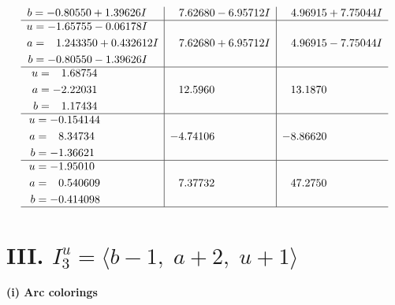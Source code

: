 \documentclass[1p]{elsarticle_modified}
\theoremstyle{definition}
\begin{document}
$$\begin{array}{c|c|c}
\begin{aligned}
b &= -0.80550 + 1.39626 I\end{aligned}
 & \phantom{-}7.62680 - 6.95712 I & \phantom{-}4.96915 + 7.75044 I \\ \hline\begin{aligned}
u &= -1.65755 - 0.06178 I \\
a &= \phantom{-}1.243350 + 0.432612 I \\
b &= -0.80550 - 1.39626 I\end{aligned}
 & \phantom{-}7.62680 + 6.95712 I & \phantom{-}4.96915 - 7.75044 I \\ \hline\begin{aligned}
u &= \phantom{-}1.68754\phantom{ +0.000000I} \\
a &= -2.22031\phantom{ +0.000000I} \\
b &= \phantom{-}1.17434\phantom{ +0.000000I}\end{aligned}
 & \phantom{-}12.5960\phantom{ +0.000000I} & \phantom{-}13.1870\phantom{ +0.000000I} \\ \hline\begin{aligned}
u &= -0.154144\phantom{ +0.000000I} \\
a &= \phantom{-}8.34734\phantom{ +0.000000I} \\
b &= -1.36621\phantom{ +0.000000I}\end{aligned}
 & -4.74106\phantom{ +0.000000I} & -8.86620\phantom{ +0.000000I} \\ \hline\begin{aligned}
u &= -1.95010\phantom{ +0.000000I} \\
a &= \phantom{-}0.540609\phantom{ +0.000000I} \\
b &= -0.414098\phantom{ +0.000000I}\end{aligned}
 & \phantom{-}7.37732\phantom{ +0.000000I} & \phantom{-}47.2750\phantom{ +0.000000I}\\
 \hline 
 \end{array}$$\newpage\newpage\renewcommand{\arraystretch}{1}
\centering \section*{III. $I^u_{3}= \langle b-1,\;a+2,\;u+1 \rangle$}
\flushleft \textbf{(i) Arc colorings}\\
\end{document}
